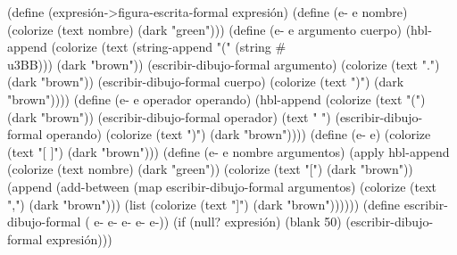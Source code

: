 \documentclass[letterpaper, twoside, openright, 11pt]{book}%
\begin{document}
{{{{{{{(define (expresión->figura-escrita-formal expresión)
  (define (e- e nombre)
    (colorize (text nombre) (dark "green")))
  (define (e- e argumento cuerpo)
    (hbl-append (colorize (text (string-append "(" (string #\\u3BB))) (dark "brown"))
                (escribir-dibujo-formal argumento)
                (colorize (text ".") (dark "brown"))
                (escribir-dibujo-formal cuerpo)
                (colorize (text ")") (dark "brown"))))
  (define (e- e operador operando)
    (hbl-append (colorize (text "(") (dark "brown"))
                (escribir-dibujo-formal operador)
                (text " ")
                (escribir-dibujo-formal operando)
                (colorize (text ")") (dark "brown"))))
  (define (e- e)
    (colorize (text "[ ]") (dark "brown")))
  (define (e- e nombre argumentos)
    (apply hbl-append
           (colorize (text nombre) (dark "green"))
           (colorize (text "[") (dark "brown"))
           (append (add-between (map escribir-dibujo-formal argumentos)
                                (colorize (text ",") (dark "brown")))
                   (list (colorize (text "]") (dark "brown"))))))
  (define escribir-dibujo-formal
    ( e- e- e-
                     e- e-))
  (if (null? expresión)
      (blank 50)
      (escribir-dibujo-formal expresión)))

}}}}}}}
\end{document}

